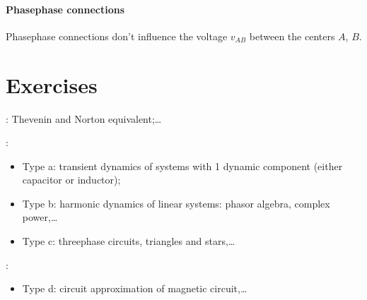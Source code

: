 \documentclass[letterpaper,10pt,italian]{jupyterBook}
\begin{document}
\paragraph{Phase\sphinxhyphen{}phase connections}
\label{\detokenize{ch/electrical-engineering-three-phase:phase-phase-connections}}
\sphinxAtStartPar
Phase\sphinxhyphen{}phase connections don’t influence the voltage \(v_{AB}\) between the centers \(A\), \(B\).

\sphinxAtStartPar
{} 

\begin{figure}[htbp]
\centering

\noindent{}
\end{figure}

\sphinxstepscope


\section{Exercises}
\label{\detokenize{ch/electrical-engineering-exercises:exercises}}\label{\detokenize{ch/electrical-engineering-exercises:classical-electromagnetism-electrical-engineering-exercises}}\label{\detokenize{ch/electrical-engineering-exercises::doc}}
\sphinxAtStartPar
{}: Thevenin and Norton equivalent;…

\sphinxAtStartPar
{}:
\begin{itemize}
\item {} 
\sphinxAtStartPar
Type a: transient dynamics of systems with 1 dynamic component (either capacitor or inductor);

\item {} 
\sphinxAtStartPar
Type b: harmonic dynamics of linear systems: phasor algebra, complex power,…

\item {} 
\sphinxAtStartPar
Type c: three\sphinxhyphen{}phase circuits, triangles and stars,…

\end{itemize}

\sphinxAtStartPar
{}:
\begin{itemize}
\item {} 
\sphinxAtStartPar
Type d: circuit approximation of magnetic circuit,…

\end{itemize}
\end{document}
